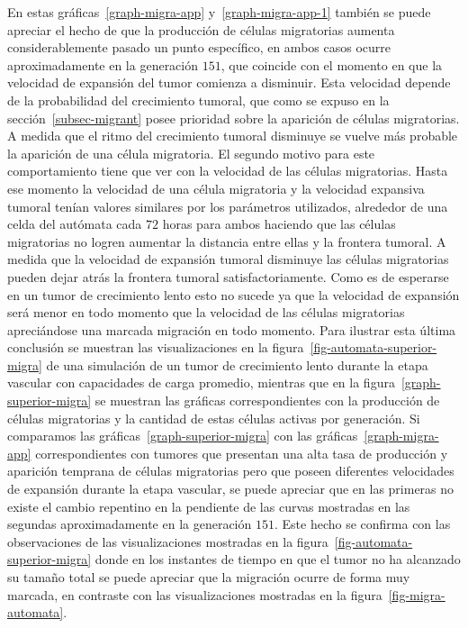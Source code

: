 En estas gr\'aficas~\ref{graph-migra-app} y~\ref{graph-migra-app-1} tambi\'en se puede apreciar el hecho de que la producci\'on de c\'elulas migratorias aumenta considerablemente pasado un punto espec\'ifico, en ambos casos ocurre aproximadamente en la generaci\'on $151$, que coincide con el momento en que la velocidad de expansi\'on del tumor comienza a disminuir. Esta velocidad depende de la probabilidad del crecimiento tumoral, que como se expuso en la secci\'on~\ref{subsec-migrant} posee prioridad sobre la aparici\'on de c\'elulas migratorias. A medida que el ritmo del crecimiento tumoral disminuye se vuelve m\'as probable la aparici\'on de una c\'elula migratoria. El segundo motivo para este comportamiento tiene que ver con la velocidad de las c\'elulas migratorias. Hasta ese momento la velocidad de una c\'elula migratoria y la velocidad expansiva tumoral ten\'ian valores similares por los par\'ametros utilizados, alrededor de una celda del aut\'omata cada $72$ horas para ambos haciendo que las c\'elulas migratorias no logren aumentar la distancia entre ellas y la frontera tumoral. A medida que la velocidad de expansi\'on tumoral disminuye las c\'elulas migratorias pueden dejar atr\'as la frontera tumoral satisfactoriamente. Como es de esperarse en un tumor de crecimiento lento esto no sucede ya que la velocidad de expansi\'on ser\'a menor en todo momento que la velocidad de las c\'elulas migratorias apreci\'andose una marcada migraci\'on en todo momento. Para ilustrar esta \'ultima conclusi\'on se muestran las visualizaciones en la figura~\ref{fig-automata-superior-migra} de una simulaci\'on de un tumor de crecimiento lento durante la etapa vascular con capacidades de carga promedio, mientras que en la figura~\ref{graph-superior-migra} se muestran las gr\'aficas correspondientes con la producci\'on de c\'elulas migratorias y la cantidad de estas c\'elulas activas por generaci\'on. Si comparamos las gr\'aficas~\ref{graph-superior-migra} con las gr\'aficas~\ref{graph-migra-app} correspondientes con tumores que presentan una alta tasa de producci\'on y aparici\'on temprana de c\'elulas migratorias pero que poseen diferentes velocidades de expansi\'on durante la etapa vascular, se puede apreciar que en las primeras no existe el cambio repentino en la pendiente de las curvas mostradas en las segundas aproximadamente en la generaci\'on $151$. Este hecho se confirma con las observaciones de las visualizaciones mostradas en la figura~\ref{fig-automata-superior-migra} donde en los instantes de tiempo en que el tumor no ha alcanzado su tama\~no total se puede apreciar que la migraci\'on ocurre de forma muy marcada, en contraste con las visualizaciones mostradas en la figura~\ref{fig-migra-automata}.

